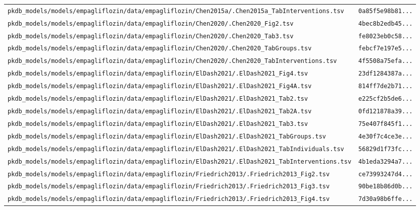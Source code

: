 \begin{longtable}{ll}
\texttt{pkdb\_models/models/empagliflozin/data/empagliflozin/Chen2015a/.Chen2015a\_TabInterventions.tsv} & \texttt{0a85f5e98b81...} \\
\texttt{pkdb\_models/models/empagliflozin/data/empagliflozin/Chen2020/.Chen2020\_Fig2.tsv} & \texttt{4bec8b2edb45...} \\
\texttt{pkdb\_models/models/empagliflozin/data/empagliflozin/Chen2020/.Chen2020\_Tab3.tsv} & \texttt{fe8023eb0c58...} \\
\texttt{pkdb\_models/models/empagliflozin/data/empagliflozin/Chen2020/.Chen2020\_TabGroups.tsv} & \texttt{febcf7e197e5...} \\
\texttt{pkdb\_models/models/empagliflozin/data/empagliflozin/Chen2020/.Chen2020\_TabInterventions.tsv} & \texttt{4f5508a75efa...} \\
\texttt{pkdb\_models/models/empagliflozin/data/empagliflozin/ElDash2021/.ElDash2021\_Fig4.tsv} & \texttt{23df1284387a...} \\
\texttt{pkdb\_models/models/empagliflozin/data/empagliflozin/ElDash2021/.ElDash2021\_Fig4A.tsv} & \texttt{814ff7de2b71...} \\
\texttt{pkdb\_models/models/empagliflozin/data/empagliflozin/ElDash2021/.ElDash2021\_Tab2.tsv} & \texttt{e225cf2b5de6...} \\
\texttt{pkdb\_models/models/empagliflozin/data/empagliflozin/ElDash2021/.ElDash2021\_Tab2A.tsv} & \texttt{0fd121878a39...} \\
\texttt{pkdb\_models/models/empagliflozin/data/empagliflozin/ElDash2021/.ElDash2021\_Tab3.tsv} & \texttt{75e407f845f1...} \\
\texttt{pkdb\_models/models/empagliflozin/data/empagliflozin/ElDash2021/.ElDash2021\_TabGroups.tsv} & \texttt{4e30f7c4ce3e...} \\
\texttt{pkdb\_models/models/empagliflozin/data/empagliflozin/ElDash2021/.ElDash2021\_TabIndividuals.tsv} & \texttt{56829d1f73fc...} \\
\texttt{pkdb\_models/models/empagliflozin/data/empagliflozin/ElDash2021/.ElDash2021\_TabInterventions.tsv} & \texttt{4b1eda3294a7...} \\
\texttt{pkdb\_models/models/empagliflozin/data/empagliflozin/Friedrich2013/.Friedrich2013\_Fig2.tsv} & \texttt{ce73993247d4...} \\
\texttt{pkdb\_models/models/empagliflozin/data/empagliflozin/Friedrich2013/.Friedrich2013\_Fig3.tsv} & \texttt{90be18b86d0b...} \\
\texttt{pkdb\_models/models/empagliflozin/data/empagliflozin/Friedrich2013/.Friedrich2013\_Fig4.tsv} & \texttt{7d30a98b6ffe...} \\

\end{longtable}
